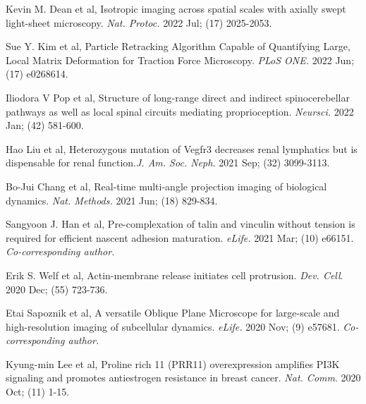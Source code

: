 \documentclass[10pt]{res}
\begin{document}
\begin{resume}
\begin{etaremune}
\item Kevin M. Dean et al, Isotropic imaging across spatial scales with axially swept light-sheet microscopy. {\it Nat. Protoc.} 2022 Jul; (17) 2025-2053.

\item Sue Y. Kim et al, Particle Retracking Algorithm Capable of Quantifying Large, Local Matrix Deformation for Traction Force Microscopy. {\it PLoS ONE.} 2022 Jun; (17) e0268614. 

\item Iliodora V Pop et al, Structure of long-range direct and indirect spinocerebellar pathways as well as local spinal circuits mediating proprioception. {\it Neursci.} 2022 Jan; (42) 581-600.

\item Hao Liu et al, Heterozygous mutation of Vegfr3 decreases renal lymphatics but is dispensable for renal function.{\it J. Am. Soc. Neph.} 2021 Sep; (32) 3099-3113.

\item Bo-Jui Chang et al, Real-time multi-angle projection imaging of biological dynamics. {\it Nat. Methods.} 2021 Jun; (18) 829-834.

\item Sangyoon J. Han et al, Pre-complexation of talin and vinculin without tension is required for efficient nascent adhesion maturation. {\it eLife.} 2021 Mar; (10) e66151. {\it Co-corresponding author.}

\item Erik S. Welf et al, Actin-membrane release initiates cell protrusion.  {\it Dev. Cell}. 2020 Dec; (55) 723-736.

\item  Etai Sapoznik et al, A versatile Oblique Plane Microscope for large-scale and high-resolution imaging of subcellular dynamics.  {\it eLife.} 2020 Nov; (9) e57681. {\it Co-corresponding author.}

\item Kyung-min Lee et al, Proline rich 11 (PRR11) overexpression amplifies PI3K signaling and promotes antiestrogen resistance in breast cancer. {\it Nat. Comm}. 2020 Oct; (11) 1-15.


\end{etaremune}
\end{resume}
\end{document}
